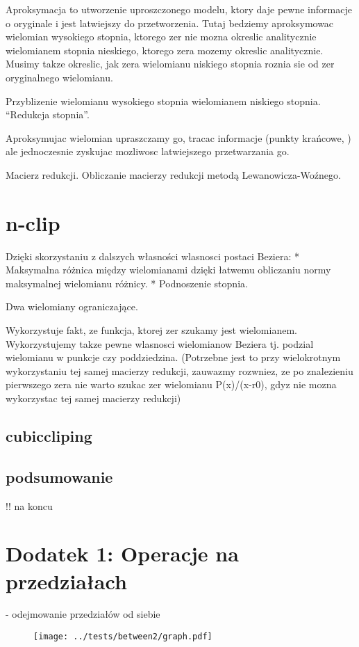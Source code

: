\documentclass[11pt,a4paper,oneside]{report}
\begin{document}
Aproksymacja to utworzenie uproszczonego modelu, ktory daje pewne informacje o oryginale i jest latwiejszy do przetworzenia. Tutaj bedziemy aproksymowac wielomian wysokiego stopnia, ktorego zer nie mozna okreslic analitycznie wielomianem stopnia nieskiego, ktorego zera mozemy okreslic analitycznie. Musimy takze okreslic, jak zera wielomianu niskiego stopnia roznia sie od zer oryginalnego wielomianu.

Przyblizenie wielomianu wysokiego stopnia wielomianem niskiego stopnia. ``Redukcja stopnia''. 

Aproksymujac wielomian upraszczamy go, tracac informacje (punkty krańcowe, ) ale jednoczesnie zyskujac mozliwosc latwiejszego przetwarzania go.

Macierz redukcji. Obliczanie macierzy redukcji metodą Lewanowicza-Woźnego.

\section{n-clip}

Dzięki skorzystaniu z dalszych własności wlasnosci postaci Beziera: 
* Maksymalna różnica między wielomianami dzięki łatwemu obliczaniu normy maksymalnej wielomianu różnicy.
* Podnoszenie stopnia.

Dwa wielomiany ograniczające.

Wykorzystuje fakt, ze funkcja, ktorej zer szukamy jest wielomianem. Wykorzystujemy takze pewne wlasnosci wielomianow Beziera tj. podzial wielomianu w punkcje czy poddziedzina. (Potrzebne jest to przy wielokrotnym wykorzystaniu tej samej macierzy redukcji, zauwazmy rozwniez, ze po znalezieniu pierwszego zera nie warto szukac zer wielomianu P(x)/(x-r0), gdyz nie mozna wykorzystac tej samej macierzy redukcji)

\subsection{cubiccliping}

\subsection{podsumowanie}

!! na koncu

\section{Dodatek 1: Operacje na przedziałach}

- odejmowanie przedziałów od siebie



\begin{center}
\begin{figure}
\texttt{[image: ../tests/between2/graph.pdf]}
\end{figure}
\end{center}
\end{document}
